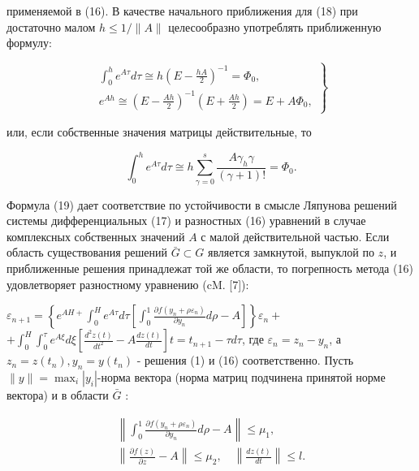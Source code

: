 \documentclass[10pt]{article}
\begin{document}
применяемой в (16). В качестве начального приближения для (18) при достаточно малом $h \leqslant 1 /\|A\|$ целесообразно употреблять приближенную формулу:



\[

\left.\begin{array}{l}

\int_{0}^{h} e^{A \tau} d \tau \cong h\left(E-\frac{h A}{2}\right)^{-1}=\Phi_{0}, \\

e^{A h} \cong\left(E-\frac{A h}{2}\right)^{-1}\left(E+\frac{A h}{2}\right)=E+A \Phi_{0},

\end{array}\right\}

\]



или, если собственные значения матрицы действительные, то



\[

\int_{0}^{h} e^{A \tau} d \tau \cong h \sum_{\gamma=0}^{s} \frac{A \gamma_{h} \gamma}{(\gamma+1) !}=\Phi_{0} .

\]



Формула (19) дает соответствие по устойчивости в смысле Ляпунова решений системы дифференциальных (17) и разностных (16) уравнений в случае комплексных собственных значений $A$ с малой действительной частью. Если область существования решений $\bar{G} \subset G$ является замкнутой, выпуклой по $z$, и приближенные решения принадлежат той же области, то погрепность метода (16) удовлетворяет разностному уравнению (cM. [7]):



$\varepsilon_{n+1}=\left\{e^{A H+} \int_{0}^{H} e^{A \tau} d \tau\left[\int_{0}^{1} \frac{\partial f\left(y_{n}+\rho \varepsilon_{n}\right)}{\partial y_{n}} d \rho-A\right]\right\} \varepsilon_{n}+$ $+\int_{0}^{H} \int_{0}^{\tau} e^{A \xi} d \xi\left[\frac{d^{2} z(t)}{d t^{2}}-A \frac{d z(t)}{d t}\right] t=t_{n+1}-\tau d \tau$, где $\varepsilon_{n}=z_{n}-y_{n}$, а $z_{n}=z\left(t_{n}\right), y_{n}=y\left(t_{n}\right)$ - решения (1) и (16) соответственно. Пусть $\|y\|=\max _{i}\left|y_{i}\right|$-норма вектора (норма матриц подчинена принятой норме вектора) и в области $\bar{G}$ :



\[

\begin{gathered}

\left\|\int_{0}^{1} \frac{\partial f\left(y_{n}+\rho \varepsilon_{n}\right)}{\partial y_{n}} d \rho-A\right\| \leqslant \mu_{1}, \\

\left\|\frac{\partial f(z)}{\partial z}-A\right\| \leqslant \mu_{2}, \quad\left\|\frac{d z(t)}{d t}\right\| \leqslant l .

\end{gathered}

\]
\end{document}

